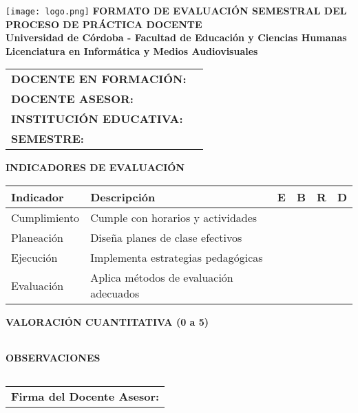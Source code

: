 \documentclass[a4paper,12pt]{article}
\begin{document}
\begin{center}
    \vspace*{1cm}
    \texttt{[image: logo.png]} %
    \vspace{0.5cm}
    \textbf{\Large FORMATO DE EVALUACIÓN SEMESTRAL DEL PROCESO DE PRÁCTICA DOCENTE} \\
    \vspace{0.5cm}
    \textbf{Universidad de Córdoba - Facultad de Educación y Ciencias Humanas} \\
    \textbf{Licenciatura en Informática y Medios Audiovisuales}
\end{center}

\vspace{0.5cm}
\begin{tabularx}{\textwidth}{@{}p{5cm}X@{}}
    \toprule
    \textbf{DOCENTE EN FORMACIÓN:} & \hrulefill \\
    \textbf{DOCENTE ASESOR:} & \hrulefill \\
    \textbf{INSTITUCIÓN EDUCATIVA:} & \hrulefill \\
    \textbf{SEMESTRE:} & \hrulefill \\
    \bottomrule
\end{tabularx}

\vspace{0.5cm}
\noindent
\textbf{INDICADORES DE EVALUACIÓN}
\begin{table}[h]
    \centering
    \scriptsize
    \begin{tabularx}{\textwidth}{|p{5cm}|X|c|c|c|c|}
        \hline
        \textbf{Indicador} & \textbf{Descripción} & \textbf{E} & \textbf{B} & \textbf{R} & \textbf{D} \\
        \hline
        Cumplimiento & Cumple con horarios y actividades & & & & \\ \hline
        Planeación & Diseña planes de clase efectivos & & & & \\ \hline
        Ejecución & Implementa estrategias pedagógicas & & & & \\ \hline
        Evaluación & Aplica métodos de evaluación adecuados & & & & \\ \hline
    \end{tabularx}
\end{table}

\vspace{0.5cm}
\noindent
\textbf{VALORACIÓN CUANTITATIVA (0 a 5)}
\begin{tabularx}{\textwidth}{|X|}
    \hline
    \vspace{1cm} \\ \hline
\end{tabularx}

\vspace{0.5cm}
\noindent
\textbf{OBSERVACIONES}
\begin{tabularx}{\textwidth}{|X|}
    \hline
    \vspace{3cm} \\ \hline
\end{tabularx}

\vspace{0.5cm}
\begin{center}
    \begin{tabular}{p{7cm}}
        \hline
        \textbf{Firma del Docente Asesor:} \hrulefill \\
    \end{tabular}
\end{center}
\end{document}
